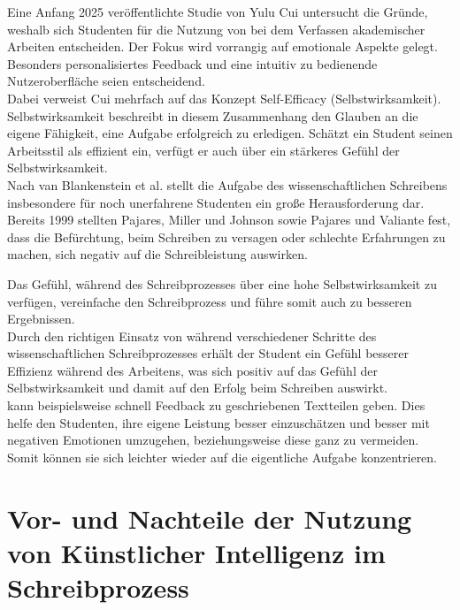 \documentclass[../main.tex]{subfiles}
\begin{document}
Eine Anfang 2025 veröffentlichte Studie von Yulu Cui untersucht die Gründe, weshalb sich Studenten für die Nutzung von 
 bei dem Verfassen akademischer Arbeiten entscheiden. Der Fokus wird vorrangig auf emotionale 
Aspekte gelegt. Besonders personalisiertes Feedback und eine intuitiv zu bedienende Nutzeroberfläche seien entscheidend.\cite{influencingUsingAi} \\
Dabei verweist Cui mehrfach auf das Konzept Self-Efficacy (Selbstwirksamkeit). Selbstwirksamkeit beschreibt in diesem Zusammenhang den Glauben 
an die eigene Fähigkeit, eine Aufgabe erfolgreich zu erledigen. Schätzt ein Student seinen Arbeitsstil als effizient ein, 
verfügt er auch über ein stärkeres Gefühl der Selbstwirksamkeit.\cite{influencingUsingAi,SelfEfficacyBeliefs}\\
Nach van Blankenstein et al. stellt die Aufgabe des wissenschaftlichen Schreibens insbesondere für noch unerfahrene Studenten 
ein große Herausforderung dar. Bereits 1999 stellten Pajares, Miller und Johnson sowie Pajares und Valiante fest,
dass die Befürchtung, beim Schreiben zu versagen oder schlechte Erfahrungen zu machen, sich negativ auf die Schreibleistung 
auswirken.\cite{writingSelfBeliefs,writingSelfBeliefsMiddleSchool}

Das Gefühl, während des Schreibprozesses über eine hohe Selbstwirksamkeit zu verfügen, vereinfache den 
Schreibprozess und führe somit auch zu besseren Ergebnissen.\cite{SelfEfficacyBeliefs} \\
Durch den richtigen Einsatz von  während verschiedener Schritte des wissenschaftlichen Schreibprozesses erhält der Student
ein Gefühl besserer Effizienz während des Arbeitens, was sich positiv auf das Gefühl der Selbstwirksamkeit und damit auf den Erfolg
beim Schreiben auswirkt.\\
 kann beispielsweise schnell Feedback zu geschriebenen Textteilen geben. Dies helfe den Studenten, ihre eigene 
Leistung besser einzuschätzen und besser mit negativen Emotionen umzugehen, beziehungsweise diese ganz zu vermeiden. Somit 
können sie sich leichter wieder auf die eigentliche Aufgabe konzentrieren.\cite{SelfEfficacyBeliefs} 



\section{Vor- und Nachteile der Nutzung von Künstlicher Intelligenz im Schreibprozess}
\end{document}
